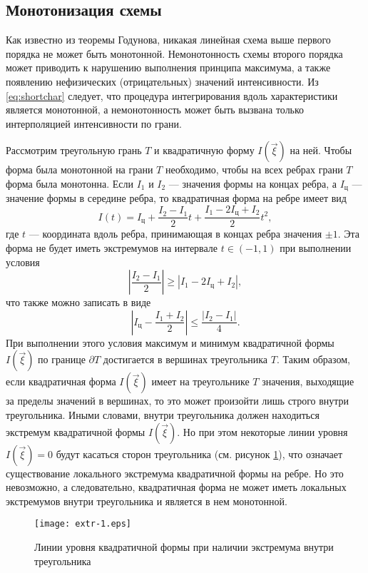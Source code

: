 \subsection{Монотонизация схемы}

Как известно из теоремы Годунова, никакая линейная схема выше первого порядка не может быть монотонной. Немонотонность схемы второго порядка может приводить к нарушению выполнения принципа максимума, а также появлению нефизических (отрицательных) значений интенсивности. Из \eqref{eq:shortchar} следует, что процедура интегрирования вдоль характеристики является монотонной, а немонотонность может быть вызвана только интерполяцией интенсивности по грани.

Рассмотрим треугольную грань $T$ и квадратичную форму $I(\vec \xi)$ на ней. Чтобы форма была монотонной на грани $T$ необходимо, чтобы на всех ребрах грани $T$ форма была монотонна.
Если $I_1$ и $I_2$ --- значения формы на концах ребра, а $I_\text{ц}$ --- значение формы в середине ребра, то квадратичная форма на ребре имеет вид
\[
I(t) = I_\text{ц} + \frac{I_2 - I_1}{2} t + \frac{I_1 -2 I_\text{ц} + I_2}{2} t^2,
\]
где $t$ --- координата вдоль ребра, принимающая в концах ребра значения $\pm 1$. Эта форма не будет иметь экстремумов на интервале $t \in (-1, 1)$ при выполнении условия
\[
\left|\frac{I_2 - I_1}{2}\right| \geq |I_1 -2 I_\text{ц} + I_2|,
\]
что также можно записать в виде
\begin{equation}
\left|I_\text{ц} - \frac{I_1 + I_2}{2}\right| \leq \frac{|I_2 - I_1|}{4}.
\label{eq:mono}
\end{equation}
При выполнении этого условия максимум и минимум квадратичной формы $I(\vec \xi)$ по границе $\partial T$ достигается в вершинах треугольника $T$. Таким образом, если квадратичная форма $I(\vec \xi)$ имеет на треугольнике $T$ значения, выходящие за пределы значений в вершинах, то это может произойти лишь строго внутри треугольника. Иными словами, внутри треугольника должен находиться экстремум квадратичной формы $I(\vec \xi)$. Но при этом некоторые линии уровня $I(\vec \xi) = 0$ будут касаться сторон треугольника (см. рисунок \ref{fig:extr}), что означает существование локального экстремума квадратичной формы на ребре. Но это невозможно, а следовательно, квадратичная форма не может иметь локальных экстремумов внутри треугольника и является в нем монотонной.
\begin{figure}[ht!]
\centering
\texttt{[image: extr-1.eps]}
\caption{Линии уровня квадратичной формы при наличии экстремума внутри треугольника}
\label{fig:extr}
\end{figure}

